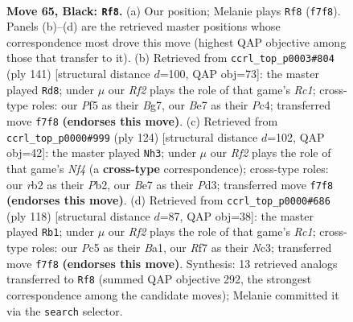 \documentclass[11pt]{article}
\begin{document}
\clearpage

\begin{figure}[p]\centering
\begin{subfigure}{0.46\textwidth}\centering
\resizebox{\linewidth}{!}{%
\newchessgame
\chessboard[
  setfen={8/3qbrk1/5n2/P1p2p1p/2Qp1Pp1/8/1R1BP2P/3N2K1 b - - 6 65},
  showmover=false,
  pgfstyle=straightmove, color=movearrow, markmove={f7-f8}
]}
\caption{}
\end{subfigure}\hfill
\begin{subfigure}{0.46\textwidth}\centering
\resizebox{\linewidth}{!}{%
\newchessgame
\chessboard[
  setfen={2r1q1k1/6b1/3P1p2/4pQ1p/2p1P3/1p1n1R2/3B2PK/1B6 b - - 0 71},
  showmover=false,
  pgfstyle=straightmove, color=movearrow, markmove={c8-d8}
]}
\caption{}
\end{subfigure}
\\[4pt]
\begin{subfigure}{0.46\textwidth}\centering
\resizebox{\linewidth}{!}{%
\newchessgame
\chessboard[
  setfen={4r3/k7/3qP1P1/1pp3r1/p2pRN2/P2P4/1P6/1K3Q2 w - - 3 63},
  showmover=false,
  pgfstyle=straightmove, color=movearrow, markmove={f4-h3}
]}
\caption{}
\end{subfigure}\hfill
\begin{subfigure}{0.46\textwidth}\centering
\resizebox{\linewidth}{!}{%
\newchessgame
\chessboard[
  setfen={4bk2/5pp1/p2p3p/3PnP2/3bP1P1/q1N4P/2Q3K1/B1R5 w - - 15 60},
  showmover=false,
  pgfstyle=straightmove, color=movearrow, markmove={c1-b1}
]}
\caption{}
\end{subfigure}
\caption{\textbf{Move 65, Black: \texttt{Rf8}.} (a) Our position; Melanie plays \texttt{Rf8} (\texttt{f7f8}). Panels (b)--(d) are the retrieved master positions whose correspondence most drove this move (highest QAP objective among those that transfer to it). (b) Retrieved from \texttt{ccrl\_top\_p0003\#804} (ply 141) [structural distance $d$=100, QAP obj=73]: the master played \texttt{Rd8}; under $\mu$ our \emph{Rf2} plays the role of that game's \emph{Rc1}; cross-type roles: our \emph{P}f5 as their \emph{B}g7, our \emph{B}e7 as their \emph{P}c4; transferred move \texttt{f7f8} \textbf{(endorses this move)}. (c) Retrieved from \texttt{ccrl\_top\_p0000\#999} (ply 124) [structural distance $d$=102, QAP obj=42]: the master played \texttt{Nh3}; under $\mu$ our \emph{Rf2} plays the role of that game's \emph{Nf4} (a \textbf{cross-type} correspondence); cross-type roles: our \emph{r}b2 as their \emph{P}b2, our \emph{B}e7 as their \emph{P}d3; transferred move \texttt{f7f8} \textbf{(endorses this move)}. (d) Retrieved from \texttt{ccrl\_top\_p0000\#686} (ply 118) [structural distance $d$=87, QAP obj=38]: the master played \texttt{Rb1}; under $\mu$ our \emph{Rf2} plays the role of that game's \emph{Rc1}; cross-type roles: our \emph{P}c5 as their \emph{B}a1, our \emph{R}f7 as their \emph{N}c3; transferred move \texttt{f7f8} \textbf{(endorses this move)}. Synthesis: 13 retrieved analogs transferred to \texttt{Rf8} (summed QAP objective 292, the strongest correspondence among the candidate moves); Melanie committed it via the \texttt{search} selector.}
\label{fig:thought-m129}
\end{figure}
\end{document}
